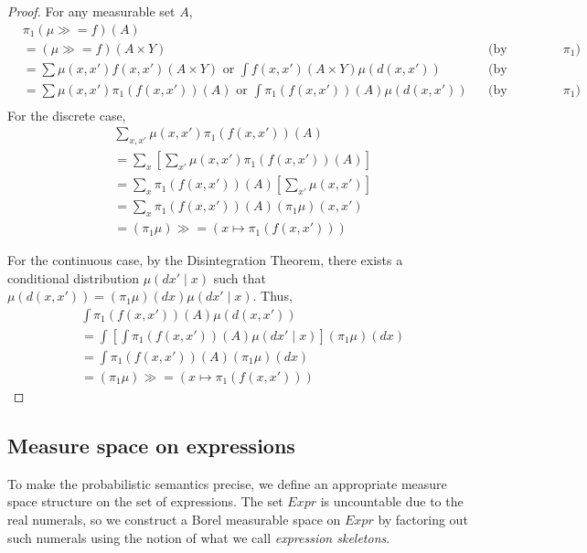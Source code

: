 \begin{proof}
	For any measurable set $A$,
	\begin{align*}
		&\pi_1(\mu \gg\!= f)(A) \\
		&= (\mu \gg\!= f)(A \times Y) && \text{(by definition of $\pi_1$)} \\
		&= \sum \mu(x,x') f(x,x')(A \times Y) \text{ or } \int f(x,x')(A \times Y) \mu(d(x,x')) && \text{(by definition of bind)} \\
		&= \sum \mu(x,x') \pi_1(f(x,x'))(A) \text{ or } \int \pi_1(f(x,x'))(A) \mu(d(x,x')) && \text{(by definition of $\pi_1$)} \\
	\end{align*}
	For the discrete case,
	\begin{align*}
		&\sum_{x,x'} \mu(x,x') \pi_1(f(x,x'))(A) \\
		&= \sum_x \left[ \sum_{x'} \mu(x,x') \pi_1(f(x,x'))(A) \right] \\
		&= \sum_x \pi_1(f(x,x'))(A) \left[ \sum_{x'} \mu(x,x') \right] \\
		&= \sum_x \pi_1(f(x,x'))(A) (\pi_1 \mu)(x,x') \\
		&= (\pi_1 \mu) \gg\!= (x \mapsto \pi_1(f(x,x')))
	\end{align*}

	For the continuous case, by the Disintegration Theorem, there exists a conditional distribution $\mu(dx' \mid x)$ such that $\mu(d(x,x')) = (\pi_1 \mu)(dx)\mu(dx' \mid x)$. Thus,
	\begin{align*}
		&\int \pi_1(f(x,x'))(A) \mu(d(x,x')) \\
		&= \int \left[ \int \pi_1(f(x,x'))(A) \mu(dx' \mid x) \right] (\pi_1 \mu)(dx) \\
		&= \int \pi_1(f(x,x'))(A) (\pi_1 \mu)(dx) \\
		&= (\pi_1 \mu) \gg\!= (x \mapsto \pi_1(f(x,x')))
	\end{align*}
\end{proof}

\subsection{Measure space on expressions}
To make the probabilistic semantics precise, we define an appropriate measure space structure on the set of expressions. The set $Expr$ is uncountable due to the real numerals, so we construct a Borel measurable space on $Expr$ by factoring out such numerals using the notion of what we call \emph{expression skeletons}.

